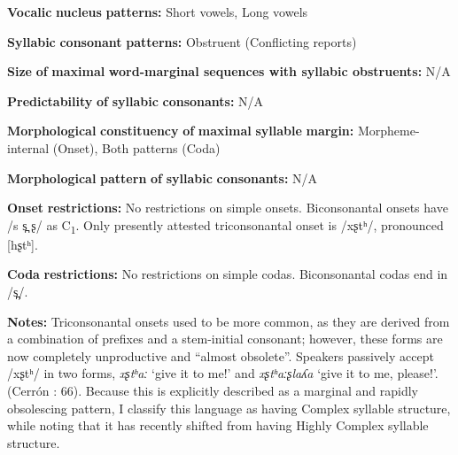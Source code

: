 \documentclass[output=paper]{langsci/langscibook}
\begin{document}
\begin{styleBody}
\textbf{Vocalic} \textbf{nucleus} \textbf{patterns:} Short vowels, Long vowels
\end{styleBody}

\begin{styleBody}
\textbf{Syllabic} \textbf{consonant} \textbf{patterns:} Obstruent (Conflicting reports)
\end{styleBody}

\begin{styleBody}
\textbf{Size} \textbf{of} \textbf{maximal} \textbf{word{}-marginal sequences with syllabic obstruents:} N/A
\end{styleBody}

\begin{styleBody}
\textbf{Predictability} \textbf{of} \textbf{syllabic} \textbf{consonants:} N/A
\end{styleBody}

\begin{styleBody}
\textbf{Morphological} \textbf{constituency} \textbf{of} \textbf{maximal} \textbf{syllable} \textbf{margin:} Morpheme-internal (Onset), Both patterns (Coda)
\end{styleBody}

\begin{styleBody}
\textbf{Morphological} \textbf{pattern} \textbf{of} \textbf{syllabic} \textbf{consonants:} N/A
\end{styleBody}

\begin{styleBody}
\textbf{Onset} \textbf{restrictions:} No restrictions on simple onsets. Biconsonantal onsets have /s s̪ ʂ/ as C\textsubscript{1}. Only presently attested triconsonantal onset is /xʂtʰ/, pronounced [hʂtʰ].
\end{styleBody}

\begin{styleBody}
\textbf{Coda} \textbf{restrictions:} No restrictions on simple codas. Biconsonantal codas end in /s̪/.
\end{styleBody}

\begin{styleBody}
\textbf{Notes:} Triconsonantal onsets used to be more common, as they are derived from a combination of prefixes and a stem-initial consonant; however, these forms are now completely unproductive and “almost obsolete”. Speakers passively accept /xʂtʰ/ in two forms, \textit{xʂtʰaː} ‘give it to me!’ and \textit{xʂtʰaːʂlaʎa} ‘give it to me, please!’. (Cerrón \citealt{Palomino2006}: 66). Because this is explicitly described as a marginal and rapidly obsolescing pattern, I classify this language as having Complex syllable structure, while noting that it has recently shifted from having Highly Complex syllable structure.
\end{styleBody}
\end{document}

